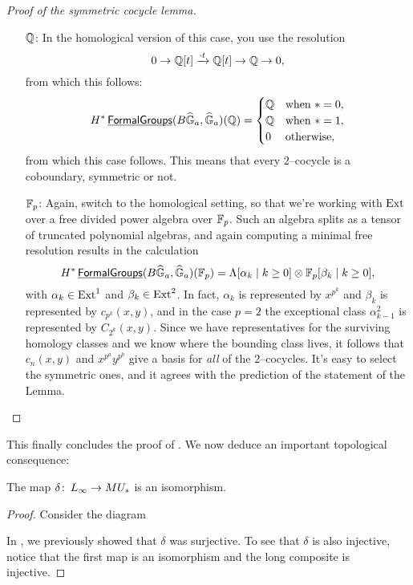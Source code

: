 \begin{proof}[Proof of the symmetric cocycle lemma]
\begin{itemize}
\item[$\mathbb{Q}$:] In the homological version of this case, you use the resolution \[0 \to \mathbb{Q}[t] \xrightarrow{\cdot t} \mathbb{Q}[t] \to \mathbb{Q} \to 0,\] from which this follows: \[H^* \operatorname{\underline{\smash{\mathsf{FormalGroups}}}}(B\widehat{\mathbb G}_a, \widehat{\mathbb G}_a)(\mathbb{Q}) = \begin{cases} \mathbb{Q} & \text{when $* = 0$}, \\ \mathbb{Q} & \text{when $* = 1$}, \\ 0 & \text{otherwise}, \end{cases}\] from which this case follows.  This means that every $2$--cocycle is a coboundary, symmetric or not.
\item[$\mathbb F_p$:] Again, switch to the homological setting, so that we're working with $\operatorname{Ext}$ over a free divided power algebra over $\mathbb F_p$.  Such an algebra splits as a tensor of truncated polynomial algebras, and again computing a minimal free resolution results in the calculation \[H^* \operatorname{\underline{\smash{\mathsf{FormalGroups}}}}(B\widehat{\mathbb G}_a, \widehat{\mathbb G}_a)(\mathbb F_p) = \Lambda[\alpha_k \mid k \ge 0] \otimes \mathbb F_p[\beta_k \mid k \ge 0],\] with $\alpha_k \in \operatorname{Ext}^1$ and $\beta_k \in \operatorname{Ext}^2$.  In fact, $\alpha_k$ is represented by $x^{p^k}$ and $\beta_k$ is represented by $c_{p^k}(x, y)$, and in the case $p = 2$ the exceptional class $\alpha_{k-1}^2$ is represented by $C_{2^k}(x, y)$.  Since we have representatives for the surviving homology classes and we know where the bounding class lives, it follows that $c_n(x, y)$ and $x^{p^a} y^{p^b}$ give a basis for \emph{all} of the $2$--cocycles.  It's easy to select the symmetric ones, and it agrees with the prediction of the statement of the Lemma. \qedhere
\end{itemize}
\end{proof}

This finally concludes the proof of .  We now deduce an important topological consequence:
\begin{corollary}
The map $\delta\colon\thinspace L_\infty \to MU_*$ is an isomorphism.
\end{corollary}
\begin{proof}
Consider the diagram
\begin{center}
\end{center}
In , we previously showed that $\delta$ was surjective.  To see that $\delta$ is also injective, notice that the first map is an isomorphism and the long composite is injective.
\end{proof}

